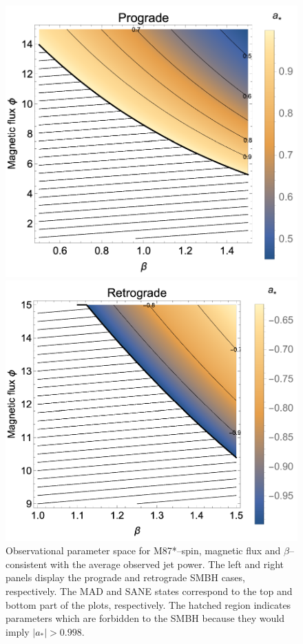 \documentclass[twocolumn, linenumbers]{aastex62} %
\begin{document}
\begin{figure}
    \centering
    \begin{minipage}{0.45\textwidth}
        \centering
        \includegraphics[width=\textwidth]{figures/phi-beta-spins-prograde.pdf} %
    \end{minipage}\hfill
    \begin{minipage}{0.45\textwidth}
        \centering
        \includegraphics[width=\textwidth]{figures/phi-beta-spins-retrograde.pdf} %
    \end{minipage}
\caption{Observational parameter space for M87*--spin, magnetic flux and $\beta$--consistent with the average observed jet power. The left and right panels display the prograde and retrograde SMBH cases, respectively. The MAD and SANE states correspond to the top and bottom part of the plots, respectively. The hatched region indicates parameters which are forbidden to the SMBH because they would imply  $|a_*|>0.998$. }
\label{spins-phi}
\end{figure}
\end{document}
